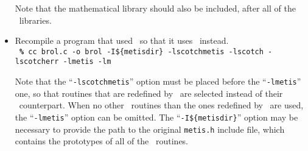 \begin{itemize}
\noi
Note that the mathematical library should also be included, after
all of the \scotch\ libraries.
\item
Recompile a program that used \metis\ so that it uses \scotch\ instead.
\\

\noi
{\tt
{\bf\%} cc brol.c -o brol -I\$\{metisdir\} -lscotchmetis -lscotch -lscotcherr -lmetis -lm}
\spa

\noi
Note that the ``{\tt -lscotch\lbt metis}'' option must be placed before the
``{\tt -lmetis}'' one, so that routines that are redefined by \scotch\ are
selected instead of their \metis\ counterpart. When no other
\metis\ routines than the ones redefined by \scotch\ are used, the
``{\tt -lmetis}'' option can be omitted. The ``{\tt -I\$\{metisdir\}}''
option may be necessary to provide the path to the original {\tt metis.h}
include file, which contains the prototypes of all of the \metis\ routines.

\end{itemize}
